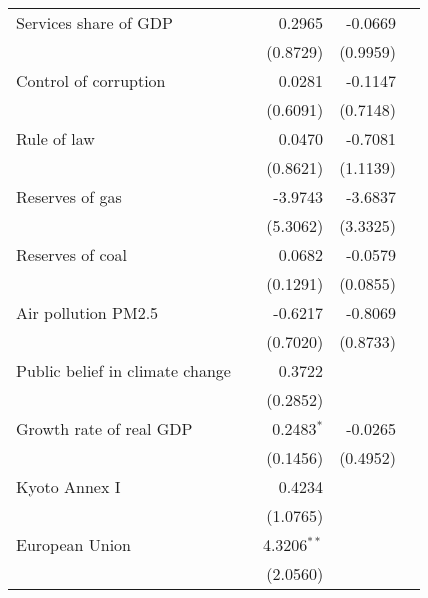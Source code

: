 \begin{tabular}{lrrrr}
Services share of GDP            &                   &             0.2965 &            -0.0669 &                   \\
                                 &                   &           (0.8729) &           (0.9959) &                   \\
Control of corruption            &                   &             0.0281 &            -0.1147 &                   \\
                                 &                   &           (0.6091) &           (0.7148) &                   \\
Rule of law                      &                   &             0.0470 &            -0.7081 &                   \\
                                 &                   &           (0.8621) &           (1.1139) &                   \\
Reserves of gas                  &                   &            -3.9743 &            -3.6837 &                   \\
                                 &                   &           (5.3062) &           (3.3325) &                   \\
Reserves of coal                 &                   &             0.0682 &            -0.0579 &                   \\
                                 &                   &           (0.1291) &           (0.0855) &                   \\
Air pollution PM2.5              &                   &            -0.6217 &            -0.8069 &                   \\
                                 &                   &           (0.7020) &           (0.8733) &                   \\
Public belief in climate change  &                   &             0.3722 &                    &                   \\
                                 &                   &           (0.2852) &                    &                   \\
Growth rate of real GDP          &                   &       0.2483$^{*}$ &            -0.0265 &                   \\
                                 &                   &           (0.1456) &           (0.4952) &                   \\
Kyoto Annex I                    &                   &             0.4234 &                    &                   \\
                                 &                   &           (1.0765) &                    &                   \\
European Union                   &                   &     4.3206$^{* *}$ &                    &                   \\
                                 &                   &           (2.0560) &                    &                   \\
\bottomrule
\end{tabular}
